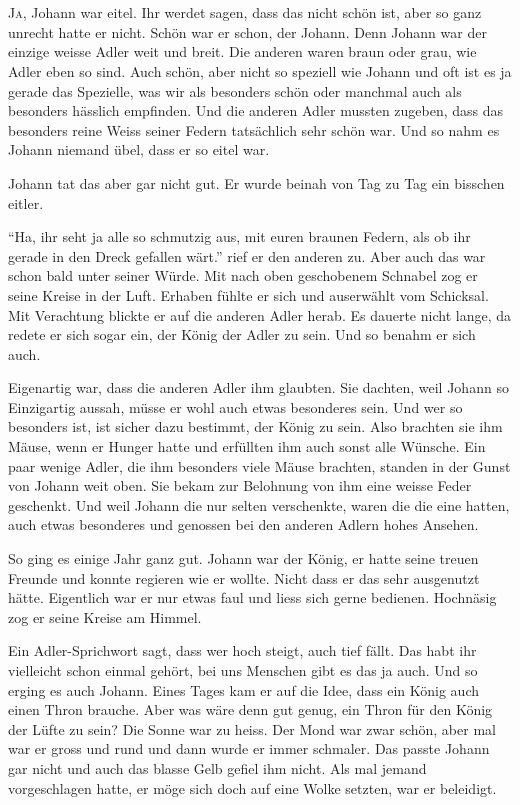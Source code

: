 \chapter*{}
\lettrine[lines=3]{\color{red}J}{a}, Johann war eitel. Ihr werdet sagen, dass das nicht schön ist, aber so ganz unrecht hatte er nicht. Schön war er schon, der Johann. Denn Johann war der einzige weisse Adler weit und breit. Die anderen waren braun oder grau, wie Adler eben so sind. Auch schön, aber nicht so speziell wie Johann und oft ist es ja gerade das Spezielle, was wir als besonders schön oder manchmal auch als besonders hässlich empfinden. Und die anderen Adler mussten zugeben, dass das besonders reine Weiss seiner Federn tatsächlich sehr schön war. Und so nahm es Johann niemand übel, dass er so eitel war. 

Johann tat das aber gar nicht gut. Er wurde beinah von Tag zu Tag ein bisschen eitler. 

\enquote{Ha, ihr seht ja alle so schmutzig aus, mit euren braunen Federn, als ob ihr gerade in den Dreck gefallen wärt.} rief er den anderen zu. Aber auch das war schon bald unter seiner Würde. Mit nach oben geschobenem Schnabel zog er seine Kreise in der Luft. Erhaben fühlte er sich und auserwählt vom Schicksal. Mit Verachtung blickte er auf die anderen Adler herab. Es dauerte nicht lange, da redete er sich sogar ein, der König der Adler zu sein. Und so benahm er sich auch.

Eigenartig war, dass die anderen Adler ihm glaubten. Sie dachten, weil Johann so Einzigartig aussah, müsse er wohl auch etwas besonderes sein. Und wer so besonders ist, ist sicher dazu bestimmt, der König zu sein. Also brachten sie ihm Mäuse, wenn er Hunger hatte und erfüllten ihm auch sonst alle Wünsche. Ein paar wenige Adler, die ihm besonders viele Mäuse brachten, standen in der Gunst von Johann weit oben. Sie bekam zur Belohnung von ihm eine weisse Feder geschenkt. Und weil Johann die nur selten verschenkte, waren die die eine hatten, auch etwas besonderes und genossen bei den anderen Adlern hohes Ansehen. 

So ging es einige Jahr ganz gut. Johann war der König, er hatte seine treuen Freunde und konnte regieren wie er wollte. Nicht dass er das sehr ausgenutzt hätte. Eigentlich war er nur etwas faul und liess sich gerne bedienen. Hochnäsig zog er seine Kreise am Himmel.

Ein Adler-Sprichwort sagt, dass wer hoch steigt, auch tief fällt. Das habt ihr vielleicht schon einmal gehört, bei uns Menschen gibt es das ja auch. Und so erging es auch Johann. Eines Tages kam er auf die Idee, dass ein König auch einen Thron brauche. Aber was wäre denn gut genug, ein Thron für den König der Lüfte zu sein? Die Sonne war zu heiss. Der Mond war zwar schön, aber mal war er gross und rund und dann wurde er immer schmaler. Das passte Johann gar nicht und auch das blasse Gelb gefiel ihm nicht. Als mal jemand vorgeschlagen hatte, er möge sich doch auf eine Wolke setzten, war er beleidigt.

